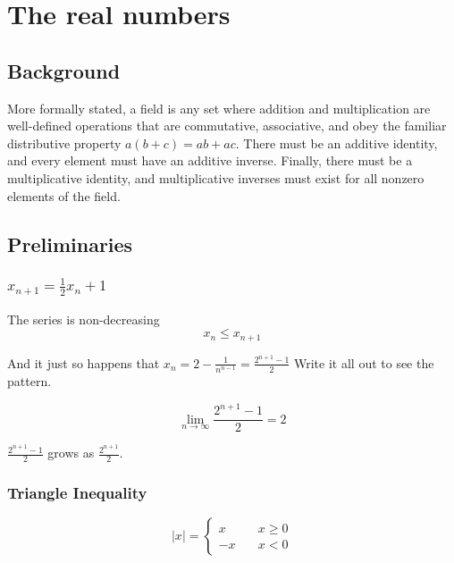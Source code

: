\section{The real numbers}

\subsection{Background}
More formally stated, a field is any set where addition and multiplication are well-defined operations
that are commutative, associative, and obey the familiar distributive property $a(b + c) = ab + ac$.
There must be an additive identity, and every element must have an additive inverse.
Finally, there must be a multiplicative identity, and multiplicative inverses must exist for
all nonzero elements of the field.



\subsection{Preliminaries}

\subsubsection{$x_{n+1} = \frac{1}{2}x_n + 1$}

The series is non-decreasing
$$
x_n \leq x_{n+1}
$$

And it just so happens that $x_n = 2 - \frac{1}{ n^{n-1} } = \frac{2^{n+1} - 1}{2}$
Write it all out to see the pattern.

$$
\lim\limits_{n \to \infty} \frac{2^{n+1} - 1}{2} = 2
$$

$\frac{2^{n+1} - 1}{2}$ grows as $\frac{2^{n+1}}{2}$.





\subsubsection{Triangle Inequality}

\begin{equation}
|x| =
  \begin{cases}
    x   & \quad x \geq 0\\
    -x  & \quad x < 0
  \end{cases}
\end{equation}


